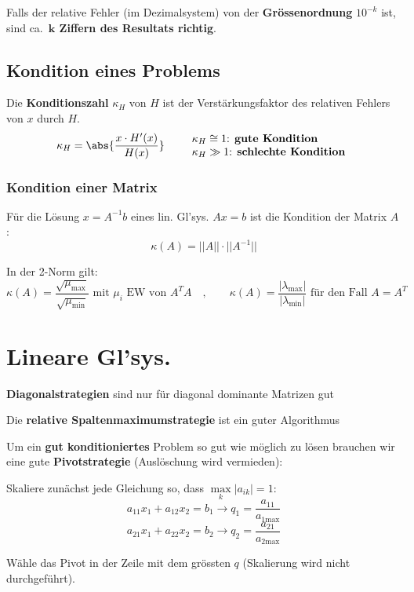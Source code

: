 			Falls der relative Fehler (im Dezimalsystem) von der \textbf{Grössenordnung} $10^{-k}$ ist, sind ca.~\textbf{$\boldsymbol k$ Ziffern des Resultats richtig}.

	\subsection{Kondition eines Problems}
		Die \textbf{Konditionszahl} $\kappa_H$ von $H$ ist der Verstärkungsfaktor des relativen Fehlers von $x$ durch $H$.
		\[
			\kappa_H = \abs{\frac{x\cdot H'(x)}{H(x)}}
			\qquad
			\begin{array}{l}
				\kappa_H \cong 1 \text{: \textbf{gute Kondition}} \\
				\kappa_H \gg 1 \text{: \textbf{schlechte Kondition}}
			\end{array}
		\]

	\subsubsection{Kondition einer Matrix}
		Für die Lösung $x= A^{-1}b$ eines lin. Gl'sys. $Ax = b$ ist die Kondition der Matrix $A$:
		\[
			\kappa (A) = ||A||\cdot ||A^{-1}||
		\]

		In der 2-Norm gilt:
		\[
			\kappa(A) = \frac{\sqrt{\mu_\text{max}}}{\sqrt{\mu_\text{min}}} \text{ mit } \mu_i \text{ EW von }A^T A
			\quad,\qquad
			\kappa(A) = \frac{|\lambda_\text{max}|}{|\lambda_\text{min}|} \text{ für den Fall } A=A^T
		\]

\section{Lineare Gl'sys.}
	\begin{tightenumerate}
		\item \textbf{Diagonalstrategien} sind nur für diagonal dominante Matrizen gut
		\item Die \textbf{relative Spaltenmaximumstrategie} ist ein guter Algorithmus
	\end{tightenumerate}

	Um ein \textbf{gut konditioniertes} Problem so gut wie möglich zu lösen brauchen wir eine gute \textbf{Pivotstrategie} (Auslöschung wird vermieden):
	\begin{tightenumerate}
		\item Skaliere zunächst jede Gleichung so, dass $\underset{k}{\max}|a_{ik}| = 1$:
		\[ a_{11}x_1 + a_{12}x_2 = b_1 \rightarrow q_1 = \frac{a_{11}}{a_{1\text{max}}}\]
		\[ a_{21}x_1 + a_{22}x_2 = b_2 \rightarrow q_2 = \frac{a_{21}}{a_{2\text{max}}}\]
		\item Wähle das Pivot in der Zeile mit dem grössten $q$ (Skalierung wird nicht durchgeführt).
	\end{tightenumerate}

